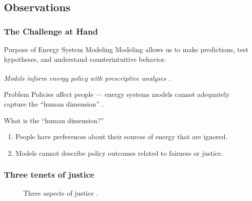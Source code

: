 \subsection{Observations}

\begin{frame}
    \frametitle{The Challenge at Hand}
    \begin{block}{Purpose of Energy System Modeling}
        Modeling allows us to make predictions, test hypotheses, and understand
        counterintuitive behavior.\\~\\
        \textit{Models inform energy policy with prescriptive analyses
        \cite{decarolis_using_2011}.}
    \end{block}
    \begin{block}{Problem} %
        Policies affect people --- energy systems models cannot adequately
        capture the ``human dimension'' \cite{pfenninger_energy_2014}.
    \end{block}
    \begin{block}{What is the ``human dimension?''}
        \begin{enumerate}
            \item People have preferences about their sources of energy that are
            ignored.
            \item Models cannot describe policy outcomes related to fairness or
            justice.
        \end{enumerate}
    \end{block}
\end{frame}

\begin{frame}
    \frametitle{Three tenets of justice}
    \begin{figure}
        \centering

        \caption{Three aspects of justice \cite{schlosberg_1_2007}.}
    \end{figure}
\end{frame}

